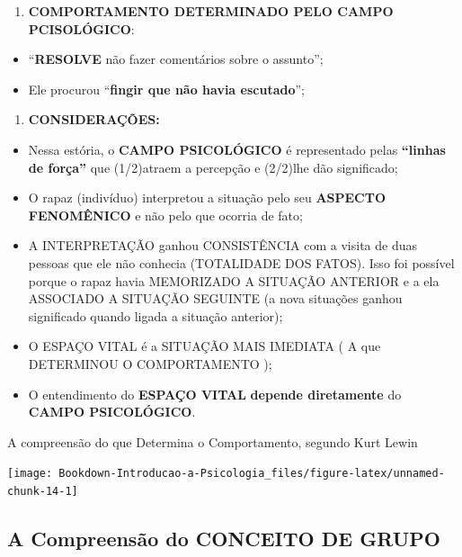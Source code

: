 \documentclass[
]{book}
\providecommand{\tightlist}{%
  \setlength{\itemsep}{0pt}\setlength{\parskip}{0pt}}
\begin{document}
\begin{enumerate}
\def\labelenumi{\arabic{enumi}.}
\setcounter{enumi}{1}
\tightlist
\item
  \textbf{COMPORTAMENTO DETERMINADO PELO CAMPO PCISOLÓGICO}:
\end{enumerate}

\begin{itemize}
\tightlist
\item
  ``\textbf{RESOLVE} não fazer comentários sobre o assunto'';
\item
  Ele procurou ``\textbf{fingir que não havia escutado}'';
\end{itemize}

\begin{enumerate}
\def\labelenumi{\arabic{enumi}.}
\setcounter{enumi}{2}
\tightlist
\item
  \textbf{CONSIDERAÇÕES:}
\end{enumerate}

\begin{itemize}
\tightlist
\item
  Nessa estória, o \textbf{CAMPO PSICOLÓGICO} é representado pelas
  \textbf{``linhas de força''} que (1/2)atraem a percepção e
  (2/2)lhe dão significado;
\item
  O rapaz (indivíduo) interpretou a situação pelo seu \textbf{ASPECTO
  FENOMÊNICO} e não pelo que ocorria de fato;
\item
  A INTERPRETAÇÃO ganhou CONSISTÊNCIA com a visita de duas pessoas que
  ele não conhecia (TOTALIDADE DOS FATOS). Isso foi possível porque o
  rapaz havia MEMORIZADO A SITUAÇÃO ANTERIOR e a ela ASSOCIADO A
  SITUAÇÃO SEGUINTE (a nova situações ganhou significado quando ligada
  a situação anterior);
\item
  O ESPAÇO VITAL é a SITUAÇÃO MAIS IMEDIATA ( A que DETERMINOU O
  COMPORTAMENTO );
\item
  O entendimento do \textbf{ESPAÇO VITAL} \textbf{depende diretamente} do
  \textbf{CAMPO PSICOLÓGICO}.
\end{itemize}

A compreensão do que Determina o Comportamento, segundo Kurt
Lewin

\texttt{[image: Bookdown-Introducao-a-Psicologia\_files/figure-latex/unnamed-chunk-14-1]}

\hypertarget{a-compreensuxe3o-do-conceito-de-grupo}{%
\subsection{A Compreensão do CONCEITO DE GRUPO}\label{a-compreensuxe3o-do-conceito-de-grupo}}
\end{document}
